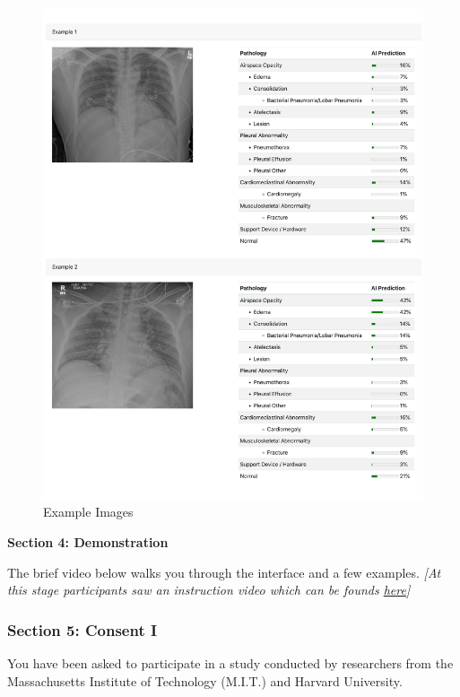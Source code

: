 \begin{figure}[H]
\caption{Example Images}

\begin{center}
\includegraphics[scale=0.8]{images/ai_instruction_example.pdf}
\end{center}
\end{figure}
\textbf{Section 4: Demonstration}

The brief video below walks you through the interface and a few examples.
\emph{{[}At this stage participants saw an instruction video which
can be founds \href{https://www.dropbox.com/s/fgdcokweekpm44r/RadExperimentV4.mp4?raw=1}{here}{]}}

\subsubsection*{Section 5: Consent I}

You have been asked to participate in a study conducted by researchers
from the Massachusetts Institute of Technology (M.I.T.) and Harvard
University.

